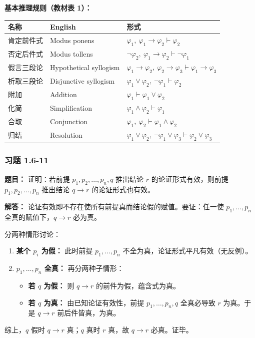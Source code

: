 \documentclass[11pt,UTF8]{article}
\begin{document}
\textbf{基本推理规则（教材表 1）：}
\begin{center}
\begin{tabular}{l|l|l}
\hline
名称 & English & 形式 \\
\hline
肯定前件式 & Modus ponens & $\varphi_1,\ \varphi_1 \to \varphi_2 \vdash \varphi_2$ \\
否定后件式 & Modus tollens & $\neg \varphi_2,\ \varphi_1 \to \varphi_2 \vdash \neg \varphi_1$ \\
假言三段论 & Hypothetical syllogism & $\varphi_1 \to \varphi_2,\ \varphi_2 \to \varphi_3 \vdash \varphi_1 \to \varphi_3$ \\
析取三段论 & Disjunctive syllogism & $\varphi_1 \lor \varphi_2,\ \neg \varphi_1 \vdash \varphi_2$ \\
附加 & Addition & $\varphi_1 \vdash \varphi_1 \lor \varphi_2$ \\
化简 & Simplification & $\varphi_1 \land \varphi_2 \vdash \varphi_1$ \\
合取 & Conjunction & $\varphi_1,\ \varphi_2 \vdash \varphi_1 \land \varphi_2$ \\
归结 & Resolution & $\varphi_1 \lor \varphi_2,\ \neg \varphi_1 \lor \varphi_3 \vdash \varphi_2 \lor \varphi_3$ \\
\hline
\end{tabular}
\end{center}

\subsubsection*{习题 1.6-11}
\textbf{题目：} 证明：若前提 $p_1, p_2, \dots, p_n, q$ 推出结论 $r$ 的论证形式有效，则前提 $p_1, p_2, \dots, p_n$ 推出结论 $q \to r$ 的论证形式也有效。

\textbf{解答：} 论证有效即不存在使所有前提真而结论假的赋值。要证：任一使 $p_1,\dots,p_n$ 全真的赋值下，$q \to r$ 必为真。

分两种情形讨论：
\begin{enumerate}
    \item \textbf{某个 $p_i$ 为假：} 此时前提 $p_1,\dots,p_n$ 不全为真，论证形式平凡有效（无反例）。
    \item \textbf{$p_1,\dots,p_n$ 全真：} 再分两种子情形：
    \begin{itemize}
        \item \textbf{若 $q$ 为假：} 则 $q \to r$ 的前件为假，蕴含式为真。
        \item \textbf{若 $q$ 为真：} 由已知论证有效性，前提 $p_1,\dots,p_n,q$ 全真必导致 $r$ 为真。于是 $q \to r$ 前后件皆真，为真。
    \end{itemize}
\end{enumerate}
综上，$q$ 假时 $q \to r$ 真；$q$ 真时 $r$ 真，故 $q \to r$ 必真。证毕。
\end{document}
